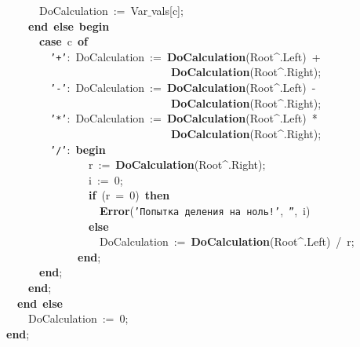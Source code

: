 \mbox{}\ \ \ \ \ \ DoCalculation\ :=\ Var$\_$vals[c]; \\
\mbox{}\ \ \ \ \textbf{end}\ \textbf{else}\ \textbf{begin} \\
\mbox{}\ \ \ \ \ \ \textbf{case}\ c\ \textbf{of} \\
\mbox{}\ \ \ \ \ \ \ \ \texttt{'+'}:\ DoCalculation\ :=\ \textbf{DoCalculation}(Root\textasciicircum{}.Left)\ + \\
\mbox{}\ \ \ \ \ \ \ \ \ \ \ \ \ \ \ \ \ \ \ \ \ \ \ \ \ \ \ \ \ \ \textbf{DoCalculation}(Root\textasciicircum{}.Right); \\
\mbox{}\ \ \ \ \ \ \ \ \texttt{'-'}:\ DoCalculation\ :=\ \textbf{DoCalculation}(Root\textasciicircum{}.Left)\ - \\
\mbox{}\ \ \ \ \ \ \ \ \ \ \ \ \ \ \ \ \ \ \ \ \ \ \ \ \ \ \ \ \ \ \textbf{DoCalculation}(Root\textasciicircum{}.Right); \\
\mbox{}\ \ \ \ \ \ \ \ \texttt{'*'}:\ DoCalculation\ :=\ \textbf{DoCalculation}(Root\textasciicircum{}.Left)\ * \\
\mbox{}\ \ \ \ \ \ \ \ \ \ \ \ \ \ \ \ \ \ \ \ \ \ \ \ \ \ \ \ \ \ \textbf{DoCalculation}(Root\textasciicircum{}.Right); \\
\mbox{}\ \ \ \ \ \ \ \ \texttt{'/'}:\ \textbf{begin} \\
\mbox{}\ \ \ \ \ \ \ \ \ \ \ \ \ \ \ r\ :=\ \textbf{DoCalculation}(Root\textasciicircum{}.Right); \\
\mbox{}\ \ \ \ \ \ \ \ \ \ \ \ \ \ \ i\ :=\ 0; \\
\mbox{}\ \ \ \ \ \ \ \ \ \ \ \ \ \ \ \textbf{if}\ (r\ =\ 0)\ \textbf{then} \\
\mbox{}\ \ \ \ \ \ \ \ \ \ \ \ \ \ \ \ \ \textbf{Error}(\texttt{'Попытка\ деления\ на\ ноль!'},\ \texttt{''},\ i) \\
\mbox{}\ \ \ \ \ \ \ \ \ \ \ \ \ \ \ \textbf{else} \\
\mbox{}\ \ \ \ \ \ \ \ \ \ \ \ \ \ \ \ \ DoCalculation\ :=\ \textbf{DoCalculation}(Root\textasciicircum{}.Left)\ /\ r; \\
\mbox{}\ \ \ \ \ \ \ \ \ \ \ \ \ \textbf{end}; \\
\mbox{}\ \ \ \ \ \ \textbf{end}; \\
\mbox{}\ \ \ \ \textbf{end}; \\
\mbox{}\ \ \textbf{end}\ \textbf{else} \\
\mbox{}\ \ \ \ DoCalculation\ :=\ 0; \\
\mbox{}\textbf{end}; \\
\mbox{} \\

